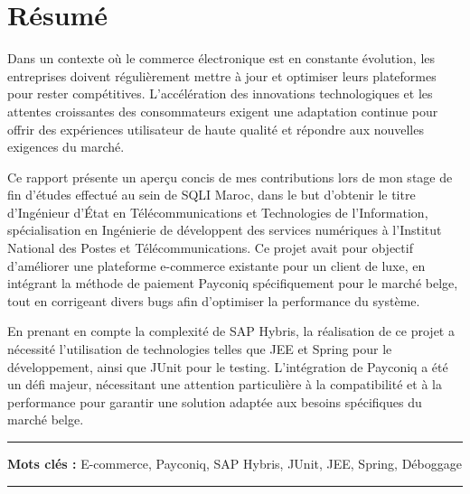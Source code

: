 

\chapter*{Résumé}

Dans un contexte où le commerce électronique est en constante évolution, les entreprises doivent régulièrement mettre à jour et optimiser leurs plateformes pour rester compétitives. L'accélération des innovations technologiques et les attentes croissantes des consommateurs exigent une adaptation continue pour offrir des expériences utilisateur de haute qualité et répondre aux nouvelles exigences du marché. \\
\vspace{10pt}


Ce rapport présente un aperçu concis de mes contributions lors de mon stage de fin d'études effectué au sein de SQLI Maroc, dans le but d'obtenir le titre d'Ingénieur d'État en Télécommunications et Technologies de l'Information, spécialisation en Ingénierie de développent des services numériques à l'Institut National des Postes et Télécommunications. Ce projet avait pour objectif d'améliorer une plateforme e-commerce existante pour un client de luxe, en intégrant la méthode de paiement Payconiq spécifiquement pour le marché belge, tout en corrigeant divers bugs afin d'optimiser la performance du système.\\
\vspace{10pt}

En prenant en compte la complexité de SAP Hybris, la réalisation de ce projet a nécessité l'utilisation de technologies telles que JEE et Spring pour le développement, ainsi que JUnit pour le testing. L'intégration de Payconiq a été un défi majeur, nécessitant une attention particulière à la compatibilité et à la performance pour garantir une solution adaptée aux besoins spécifiques du marché belge.
\vspace{10pt}

\noindent\rule[2pt]{\textwidth}{0.5pt}

{\textbf{Mots clés :}}
E-commerce, Payconiq, SAP Hybris, JUnit, JEE, Spring, Déboggage
\\
\noindent\rule[2pt]{\textwidth}{0.5pt}